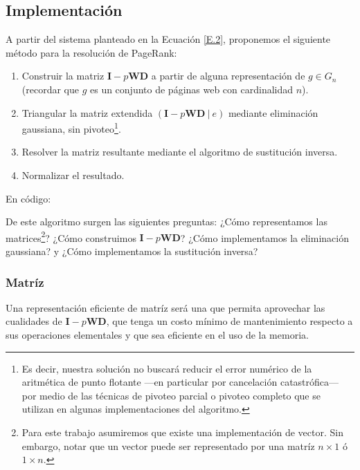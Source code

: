 \vspace{1em}

\subsection{Implementación} A partir del sistema planteado en la Ecuación \ref{E.2}, proponemos el siguiente método para la resolución de PageRank:
\vspace{1em}

\begin{enumerate}
    \item Construir la matriz $\textbf{I} - p\textbf{W}\textbf{D}$ a partir de alguna representación de $g \in G_n$ (recordar que $g$ es un conjunto de páginas web con cardinalidad $n$).
    \item Triangular la matriz extendida $(\textbf{I} - p\textbf{W}\textbf{D}\ |\ e)$  mediante eliminación gaussiana, sin pivoteo\footnote{Es decir, nuestra solución no buscará reducir el error numérico de la aritmética de punto flotante ---en particular por cancelación catastrófica--- por medio de las técnicas de pivoteo parcial o pivoteo completo que se utilizan en algunas implementaciones del algoritmo.}.
    \item Resolver la matriz resultante mediante el algoritmo de sustitución inversa. 
    \item Normalizar el resultado.
\end{enumerate}
\vspace{1em} 

\noindent En código:
\vspace{1em}


\vspace{1em}

De este algoritmo surgen las siguientes preguntas: ¿Cómo representamos las matrices\footnote{Para este trabajo asumiremos que existe una implementación de vector. Sin embargo, notar que un vector puede ser representado por una matríz $n \times 1$ ó $1 \times n$.}? ¿Cómo construimos $\mathbf{I} - p\mathbf{W}\mathbf{D}$? ¿Cómo implementamos la eliminación gaussiana? y ¿Cómo implementamos la sustitución inversa? 





\vspace{2em}
\subsubsection{Matríz} Una representación eficiente de matríz será una que permita aprovechar las cualidades de $\mathbf{I} - p\mathbf{W}\mathbf{D}$, que tenga un costo mínimo de mantenimiento respecto a sus operaciones elementales y que sea eficiente en el uso de la memoria. 
\vspace{1em}

